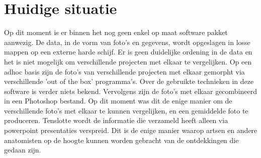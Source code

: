 \section{Huidige situatie}
\label{huidigesituatie}
Op dit moment is er binnen het \casamproject nog geen enkel op maat software pakket aanwezig.
De data, in de vorm van foto's en gegevens, wordt opgeslagen in losse mappen op een externe harde schijf. 
Er is geen duidelijke ordening in de data en het is niet mogelijk om verschillende projecten met elkaar te vergelijken.
Op een adhoc basis zijn de foto's van verschillende projecten met elkaar gemorpht via verschillende 'out of the box' programma's. 
Over de gebruikte technieken in deze software is verder niets bekend. 
Vervolgens zijn de foto's met elkaar gecombineerd in een Photoshop bestand. Op dit moment was dit de enige manier om de verschillende foto's met elkaar te kunnen vergelijken, en een gemiddelde foto te produceren.
Tenslotte wordt de informatie die \casam verzameld heeft alleen via powerpoint presentaties verspreid. 
Dit is de enige manier waarop artsen en andere anatomisten op de hoogte kunnen worden gebracht van de ontdekkingen die gedaan zijn.
